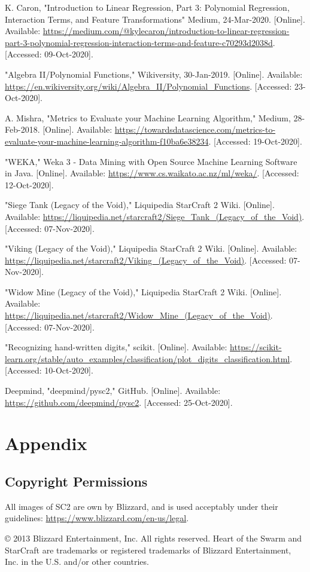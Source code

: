 \documentclass[a4paper,12pt]{report}
\begin{document}
\begin{enumerate}[label={[\arabic*]}]
\item K. Caron, "Introduction to Linear Regression, Part 3: Polynomial Regression, Interaction Terms, and Feature Transformations" Medium, 24-Mar-2020. [Online]. Available: \url{https://medium.com/@kylecaron/introduction-to-linear-regression-part-3-polynomial-regression-interaction-terms-and-feature-c70293d2038d}. [Accessed: 09-Oct-2020]. 
\item "Algebra II/Polynomial Functions," Wikiversity, 30-Jan-2019. [Online]. Available: \url{https://en.wikiversity.org/wiki/Algebra_II/Polynomial_Functions}. [Accessed: 23-Oct-2020]. 
\item A. Mishra, "Metrics to Evaluate your Machine Learning Algorithm," Medium, 28-Feb-2018. [Online]. Available: \url{https://towardsdatascience.com/metrics-to-evaluate-your-machine-learning-algorithm-f10ba6e38234}. [Accessed: 19-Oct-2020]. 
\item "WEKA," Weka 3 - Data Mining with Open Source Machine Learning Software in Java. [Online]. Available: \url{https://www.cs.waikato.ac.nz/ml/weka/}. [Accessed: 12-Oct-2020]. 
\item "Siege Tank (Legacy of the Void)," Liquipedia StarCraft 2 Wiki. [Online]. Available: \url{https://liquipedia.net/starcraft2/Siege_Tank_(Legacy_of_the_Void)}. [Accessed: 07-Nov-2020]. 
\item "Viking (Legacy of the Void)," Liquipedia StarCraft 2 Wiki. [Online]. Available: \url{https://liquipedia.net/starcraft2/Viking_(Legacy_of_the_Void)}. [Accessed: 07-Nov-2020]. 
\item "Widow Mine (Legacy of the Void)," Liquipedia StarCraft 2 Wiki. [Online]. Available: \url{https://liquipedia.net/starcraft2/Widow_Mine_(Legacy_of_the_Void)}. [Accessed: 07-Nov-2020]. 
\item "Recognizing hand-written digits," scikit. [Online]. Available: \url{https://scikit-learn.org/stable/auto_examples/classification/plot_digits_classification.html}. [Accessed: 10-Oct-2020]. 
\item Deepmind, "deepmind/pysc2," GitHub. [Online]. Available: \url{https://github.com/deepmind/pysc2}. [Accessed: 25-Oct-2020].
\end{enumerate}

\chapter{Appendix}
\section{Copyright Permissions}

All images of SC2 are own by Blizzard, and is used acceptably under their guidelines: \url{https://www.blizzard.com/en-us/legal}.

© 2013 Blizzard Entertainment, Inc. All rights reserved. Heart of the Swarm and StarCraft are trademarks or registered trademarks of Blizzard Entertainment, Inc. in the U.S. and/or other countries.
\end{document}
